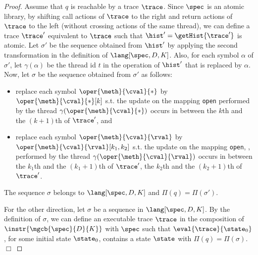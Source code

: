 \begin{proof}
Assume that $q$ is reachable by a trace $\trace$. %
Since $\spec$ is an atomic library, by shifting call actions of $\trace$ to the right and return actions of $\trace$ to the left (without crossing actions of the same thread), we can define a trace $\trace'$ equivalent to $\trace$ such that $\hist'=\getHist{\trace'}$ is atomic. 
Let $\sigma'$ be the sequence obtained from $\hist'$ by applying the second transformation in the definition of $\lang[\spec,D,K]$.
Also, for each symbol $\alpha$ of $\sigma'$, let $\gamma(\alpha)$ be the thread id $t$ in the operation of $\hist'$ that is replaced by $\alpha$.
Now, let $\sigma$ be the sequence obtained from $\sigma'$ as follows:
\begin{itemize}
	\item replace each symbol $\oper{\meth}{\cval}{*}$ by $\oper{\meth}{\cval}{*}[k]$ s.t. the update on the mapping {\tt open} performed by the thread $\gamma(\oper{\meth}{\cval}{*})$ occurs in between the $k$th and the $(k+1)$th {\shwrite} of $\trace'$, and 
	\item replace each symbol $\oper{\meth}{\cval}{\rval}$ by $\oper{\meth}{\cval}{\rval}[k_1,k_2]$ s.t. the update on the mapping {\tt open}, , performed by the thread $\gamma(\oper{\meth}{\cval}{\rval})$ occurs in between the $k_1$th and the $(k_1+1)$th {\shwrite} of $\trace'$, \resp the $k_2$th and the $(k_2+1)$th {\shwrite} of $\trace'$.
\end{itemize}
The sequence $\sigma$ belongs to $\lang[\spec,D,K]$ and $\Pi(q)=\Pi(\sigma')$.

For the other direction, let $\sigma$ be a sequence in $\lang[\spec,D,K]$. By the definition of $\sigma$, 
we can define an executable trace $\trace$ in the composition of $\instr{\mgcb{\spec}{D}{K}}$ with $\spec$ 
such that $\eval{\trace}{\state_0}$, for some initial state $\state_0$, contains a state $\state$ with $\Pi(q)=\Pi(\sigma)$.
\hfill$\Box$
\end{proof}



